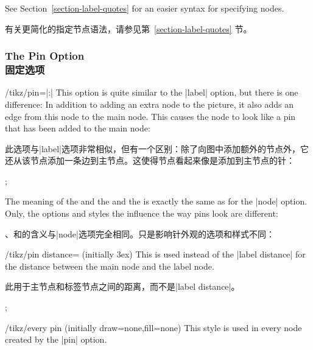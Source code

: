 See Section~\ref{section-label-quotes} for an easier syntax for specifying
nodes.

有关更简化的指定节点语法，请参见第~\ref{section-label-quotes} 节。

\subsubsection{The Pin Option\\固定选项}

\begin{key}{/tikz/pin=|:|}
    This option is quite similar to the |label| option, but there is one
    difference: In addition to adding an extra node to the picture, it also
    adds an edge from this node to the main node. This causes the node to look
    like a pin that has been added to the main node:
    
    此选项与|label|选项非常相似，但有一个区别：除了向图中添加额外的节点外，它还从该节点添加一条边到主节点。这使得节点看起来像是添加到主节点的针：
\begin{codeexample}[]
\tikz \node [circle,fill=blue!50,minimum size=1cm,pin=60:$q_0$] {};
\end{codeexample}

    The meaning of the  and the  and the 
    is exactly the same as for the |node| option. Only, the options and styles
    the influence the way pins look are different:
    
    、和的含义与|node|选项完全相同。只是影响针外观的选项和样式不同：
    \begin{key}{/tikz/pin distance= (initially 3ex)}
        This  is used instead of the |label distance| for the
        distance between the main node and the label node.
        
        此用于主节点和标签节点之间的距离，而不是|label distance|。
\begin{codeexample}[]
\tikz[pin distance=1cm]
  ;
\end{codeexample}
    \end{key}

    \begin{stylekey}{/tikz/every pin (initially {draw=none,fill=none})}
        This style is used in every node created by the |pin| option.


\end{stylekey}
\end{key}
